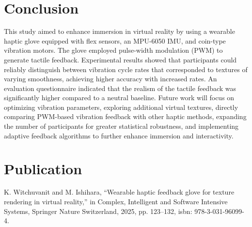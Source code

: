 \documentclass[a4paper,twocolumn]{article}
\begin{document}

\section{Conclusion}
This study aimed to enhance immersion in virtual reality by using a wearable haptic glove equipped with flex sensors, an MPU-6050 IMU, and coin-type vibration motors. The glove employed pulse-width modulation (PWM) to generate tactile feedback. 
Experimental results showed that participants could reliably distinguish between vibration cycle rates that corresponded to textures of varying smoothness, achieving higher accuracy with increased rates. An evaluation questionnaire indicated that the realism of the tactile feedback was significantly higher compared to a neutral baseline.
Future work will focus on optimizing vibration parameters, exploring additional virtual textures, directly comparing PWM-based vibration feedback with other haptic methods, expanding the number of participants for greater statistical robustness, and implementing adaptive feedback algorithms to further enhance immersion and interactivity.


\scriptsize

\section*{Publication}
  \scriptsize
	\begin{enumerate}
		 K. Witchuvanit and M. Ishihara, “Wearable haptic feedback glove for texture rendering in virtual reality,” in Complex, Intelligent and Software Intensive Systems, Springer Nature Switzerland, 2025, pp. 123–132, isbn: 978-3-031-96099-4.
	\end{enumerate}
\end{document}
